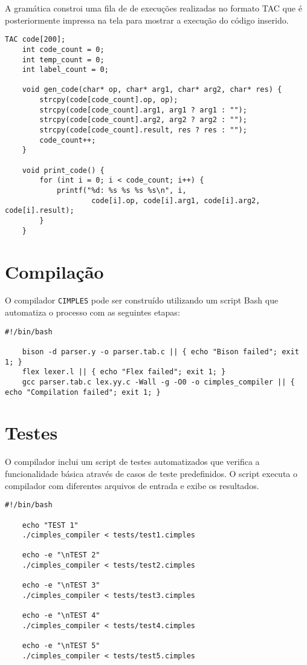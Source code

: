\documentclass[10pt,twocolumn]{article}
\begin{document}
    A gramática constroi uma fila de de execuções realizadas no formato TAC
    que é posteriormente impressa na tela para mostrar a execução do código inserido.
    
    \begin{lstlisting}[caption=Geração de código para a fila e impressão,captionpos=b]
    TAC code[200];
    int code_count = 0;
    int temp_count = 0;
    int label_count = 0;

    void gen_code(char* op, char* arg1, char* arg2, char* res) {
        strcpy(code[code_count].op, op);
        strcpy(code[code_count].arg1, arg1 ? arg1 : "");
        strcpy(code[code_count].arg2, arg2 ? arg2 : "");
        strcpy(code[code_count].result, res ? res : "");
        code_count++;
    }

    void print_code() {
        for (int i = 0; i < code_count; i++) {
            printf("%d: %s %s %s %s\n", i, 
                    code[i].op, code[i].arg1, code[i].arg2, code[i].result);
        }
    }
    \end{lstlisting}

\section{Compilação}
    O compilador \texttt{CIMPLES} pode ser construído utilizando um script Bash que 
    automatiza o processo com as seguintes etapas:

    \begin{lstlisting}[caption=Arquivo \textit{bash} para o build,captionpos=b]
    #!/bin/bash

    bison -d parser.y -o parser.tab.c || { echo "Bison failed"; exit 1; }
    flex lexer.l || { echo "Flex failed"; exit 1; }
    gcc parser.tab.c lex.yy.c -Wall -g -O0 -o cimples_compiler || { echo "Compilation failed"; exit 1; }
    \end{lstlisting}

\section{Testes}

    O compilador inclui um script de testes automatizados que verifica a 
    funcionalidade básica através de casos de teste predefinidos. O script executa 
    o compilador com diferentes arquivos de entrada e exibe os resultados.
    \begin{lstlisting}[caption=Arquivo \textit{bash} para os testes,captionpos=b]
    #!/bin/bash

    echo "TEST 1"
    ./cimples_compiler < tests/test1.cimples

    echo -e "\nTEST 2"
    ./cimples_compiler < tests/test2.cimples

    echo -e "\nTEST 3"
    ./cimples_compiler < tests/test3.cimples

    echo -e "\nTEST 4"
    ./cimples_compiler < tests/test4.cimples

    echo -e "\nTEST 5"
    ./cimples_compiler < tests/test5.cimples
    \end{lstlisting}
    
\end{document}
